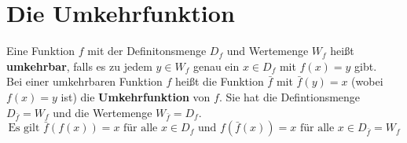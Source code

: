 \section{Die Umkehrfunktion}

\begin{definition}
    Eine Funktion $f$ mit der Definitonsmenge $D_f$ und Wertemenge $W_f$ heißt \textbf{umkehrbar}, falls es zu jedem $y \in W_f$ genau ein $x \in D_f$ mit $f(x) = y$ gibt. \\
    Bei einer umkehrbaren Funktion $f$ heißt die Funktion $\bar{f}$ mit $\bar{f}(y) = x$ (wobei $f(x) = y$ ist) die \textbf{Umkehrfunktion} von $f$. Sie hat die Defintionsmenge $D_{\bar{f}} = W_f$ und die Wertemenge $W_{\bar{f}} = D_f$.
    $$\text{Es gilt } \bar{f}(f(x)) = x \text{ für alle } x \in D_f \text{ und } f(\bar{f}(x)) = x \text{ für alle } x \in D_{\bar{f}} = W_f$$
\end{definition}

